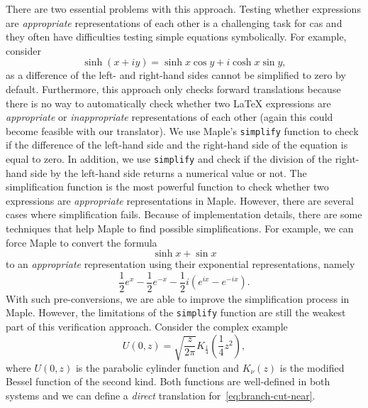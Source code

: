 \documentclass[a4paper,11pt]{article}
\newcommand{\Maple}{Maple}
\theoremstyle{defTheoStyle}
\theoremstyle{defExampStyle}
\DeclareRobustCommand{\cpi}{{\pi}}
\DeclareRobustCommand{\expe}{{e}}
\DeclareRobustCommand{\iunit}{{i}}
\begin{document}
	There are two essential problems with this approach. Testing whether expressions are {\it appropriate} representations of each other is a challenging task for \gls*{cas} and they often have difficulties testing simple equations symbolically. For example, 
	consider
	\parencite[(4.35.34)]{NIST:DLMF}
	\begin{equation*}
		\sinh \left( x+\iunit y \right) = \sinh x \cos y + \iunit \cosh x \sin y,
	\end{equation*}
	as a difference of the left- and right-hand sides cannot be simplified to zero by default. Furthermore, this approach only checks forward translations because there is no way to automatically check whether two \LaTeX{} expressions are {\it appropriate} or {\it inappropriate} representations of each other (again this could become feasible with our translator). We use \Maple's \texttt{simplify} function to check if the difference of the left-hand side and the right-hand side of the equation is equal to zero. In addition, we use \texttt{simplify} and check if the division of the right-hand side by the left-hand side returns a numerical value or not. The simplification function is the most powerful function to check whether two expressions are {\it appropriate} representations in \Maple. However, there are several cases where simplification fails. Because of implementation details, there are some techniques that help \Maple{} to find possible simplifications. For example, we can force \Maple{} to convert the formula
	\begin{equation}
	\sinh{x} + \sin{x}
	\end{equation}
	to an {\it appropriate} representation using their exponential representations, namely
	\begin{equation}
	\frac{1}{2}\expe^x - \frac{1}{2}\expe^{-x} - \frac{1}{2} \iunit \left( \expe^{\iunit x}-\expe^{-\iunit x} \right).
	\end{equation}
	With such pre-conversions, we are able to improve the simplification process in \Maple. However, the limitations of the \texttt{simplify} function are still the weakest part of this verification approach. Consider the complex example~\parencite[(12.7.10)]{NIST:DLMF}
	\begin{equation}\label{eq:branch-cut-near}
	\displaystyle U(0,z) = \sqrt{\frac{z}{2\cpi}} K_{\frac{1}{4}}\left(\frac{1}{4}z^2\right),
	\end{equation}
	where $U(0,z)$ is the parabolic cylinder function and $K_\nu(z)$ is the modified Bessel function of the second kind. Both functions are well-defined in both systems and we can define a \textit{direct} translation for~\eqref{eq:branch-cut-near}. 
\end{document}

